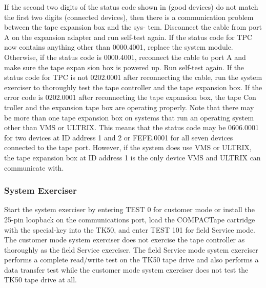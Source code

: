 If the second two digits of the status code shown in  (good
devices) do not match the first two digits (connected devices), then there
is a communication problem between the tape expansion box and the sys-
tem. Disconnect the cable from port A on the expansion adapter and run
self-test again. If the status code for TPC now contains anything other than
0000.4001, replace the system module. Otherwise, if the status code is
0000.4001, reconnect the cable to port A and make sure the tape expan
sion box is powered up. Run self-test again. If the status code for TPC
is not 0202.0001 after reconnecting the cable, run the system exerciser to
thoroughly test the tape controller and the tape expansion box. If the error
code is 0202.0001 after reconnecting the tape expansion box, the tape Con
troller and the expansion tape box are operating properly. Note that there
may be more than one tape expansion box on systems that run an operating
system other than VMS or ULTRIX. This means that the status code may be
0606.0001 for two devices at ID address 1 and 2 or FEFE.0001 for all seven
devices connected to the tape port. However, if the system does use VMS
or ULTRIX, the tape expansion box at ID address 1 is the only device VMS
and ULTRIX can communicate with.

\subsubsection{System Exerciser}

Start the system exerciser by entering TEST 0 for customer mode or install
the 25-pin loopback on the communications port, load the COMPACTape
cartridge with the special-key into the TK50, and enter TEST 101 for field
Service mode. The customer mode system exerciser does not exercise the
tape controller as thoroughly as the field Service exerciser. The field Service
mode system exerciser performs a complete read/write test on the TK50
tape drive and also performs a data transfer test while the customer mode
system exerciser does not test the TK50 tape drive at all.

